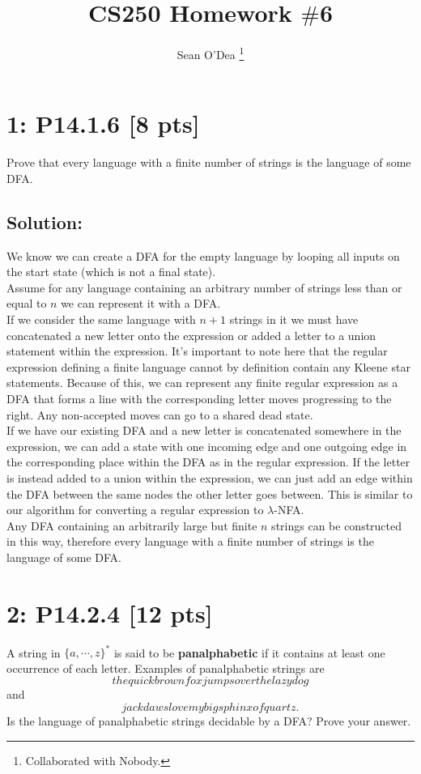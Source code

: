 \documentclass[12pt]{article}
\title{CS250 Homework $\#$6}
\author{Sean O'Dea \footnote{Collaborated with Nobody.}}
\begin{document}
\maketitle

\section*{\textbf{1: P14.1.6} [8 pts]}
Prove that every language with a finite number of strings is the language of some DFA.


\subsection*{\textbf{Solution:}}
We know we can create a DFA for the empty language by looping all inputs on the start state (which is not a final state). \\

Assume for any language containing an arbitrary number of strings less than or equal to $n$ we can represent it with a DFA. \\

If we consider the same language with $n+1$ strings in it we must have concatenated a new letter onto the expression or added a letter to a union statement within the expression. It's important to note here that the regular expression defining a finite language cannot by definition contain any Kleene star statements. Because of this, we can represent any finite regular expression as a DFA that forms a line with the corresponding letter moves progressing to the right. Any non-accepted moves can go to a shared dead state. \\

If we have our existing DFA and a new letter is concatenated somewhere in the expression, we can add a state with one incoming edge and one outgoing edge in the corresponding place within the DFA as in the regular expression. If the letter is instead added to a union within the expression, we can just add an edge within the DFA between the same nodes the other letter goes between. This is similar to our algorithm for converting a regular expression to $\lambda$-NFA.\\

Any DFA containing an arbitrarily large but finite $n$ strings can be constructed in this way, therefore every language with a finite number of strings is the language of some DFA.


\newpage
\section*{\textbf{2: P14.2.4} [12 pts]}
A string in $\{a, \cdots , z\}^*$ is said to be \textbf{panalphabetic} if it contains at least one occurrence of each letter. Examples of panalphabetic strings are
$$thequickbrownfoxjumpsoverthelazydog$$ and $$jackdawslovemybigsphinxofquartz.$$ Is the language of panalphabetic strings decidable by a DFA? Prove your answer.
\end{document}
